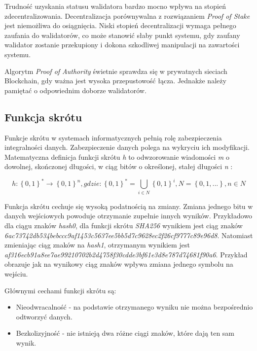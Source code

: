 \documentclass[a4paper,12pt]{book}
\begin{document}
Trudność uzyskania statusu walidatora bardzo mocno wpływa na stopień zdecentralizowania. Decentralizacja porównywalna z rozwiązaniem \textit{Proof of Stake} jest niemożliwa do osiągnięcia.
Niski stopień decentralizacji wymaga pełnego zaufania do walidatorów, co może stanowić słaby punkt systemu, gdy zaufany walidator zostanie przekupiony i dokona szkodliwej manipulacji na zawartości systemu.

Algorytm \textit{Proof of Authority} świetnie sprawdza się w prywatnych sieciach Blockchain, gdy ważna jest wysoka przepustowość łącza. Jednakże należy pamiętać o odpowiednim doborze walidatorów\cite{abpoa}.

\subsection{Funkcja skrótu}

Funkcje skrótu w systemach informatycznych pełnią rolę zabezpieczenia integralności danych. Zabezpieczenie danych polega na wykryciu ich modyfikacji. Matematyczna definicja funkcji skrótu \textit{h} to odwzorowanie wiadomości \textit{m} o dowolnej, skończonej długości, w ciąg bitów o określonej, stałej długości \textit{n} \cite{hash}:

\begin{equation}
h:\left \{0, 1\right \}^{*}\rightarrow \left \{0, 1\right \}^{n}, gdzie: \left \{0, 1\right \}^{*}=\bigcup_{i\in  N}\left \{0, 1\right \}^{i}, N = \left \{0, 1, ...\right \}, n \in N
\end{equation}

Funkcja skrótu cechuje się wysoką podatnością na zmiany. Zmiana jednego bitu w danych wejściowych powoduje otrzymanie zupełnie innych wyników. \newline
Przykładowo dla ciągu znaków \textit{hash0}, dla funkcji skrótu \textit{SHA256} wynikiem jest ciąg znaków
\newline \textit{6ac73742db534bebccc9af1453c5637ee5bb5d7c9628ec2f26cf9777c89e96d8}. Natomiast zmieniając ciąg znaków na \textit{hash1}, otrzymanym wynikiem jest \newline \textit{af316ecb91a8ee7ae99210702b2d4758f30cdde3bf61e3d8e787d74681f90a6}. Przykład obrazuje jak na wynikowy ciąg znaków wpływa zmiana jednego symbolu na wejściu.

Głównymi cechami funkcji skrótu są:
\begin{itemize}
	\item Nieodwracalność - na podstawie otrzymanego wyniku nie można bezpośrednio odtworzyć danych.
	\item Bezkolizyjność - nie istnieją dwa różne ciągi znaków, które dają ten sam wynik.
\end{itemize}
\end{document}
